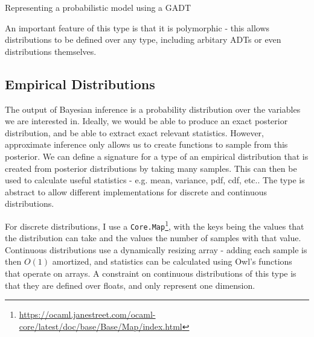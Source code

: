 \begin{listing}[!ht]
	\caption{Representing a probabilistic model using a GADT}
	\label{lst:gadt1}
\end{listing}

An important feature of this type is that it is polymorphic - this allows distributions to be defined over any type, including arbitary ADTs or even distributions themselves.

\subsection{Empirical Distributions}

The output of Bayesian inference is a probability distribution over the variables we are interested in. Ideally, we would be able to produce an exact posterior distribution, and be able to extract exact relevant statistics. However, approximate inference only allows us to create functions to sample from this posterior. We can define a signature for a type of an empirical distribution that is created from posterior distributions by taking many samples. This can then be used to calculate useful statistics - e.g. mean, variance, pdf, cdf, etc.. The type is abstract to allow different implementations for discrete and continuous distributions. 
	
For discrete distributions, I use a \texttt{Core.Map}\footnote{\url{https://ocaml.janestreet.com/ocaml-core/latest/doc/base/Base/Map/index.html}}, with the keys being the values that the distribution can take and the values the number of samples with that value. Continuous distributions use a dynamically resizing array - adding each sample is then $O(1)$ amortized, and statistics can be calculated using Owl's functions that operate on arrays. A constraint on continuous distributions of this type is that they are defined over floats, and only represent one dimension.
	
	
